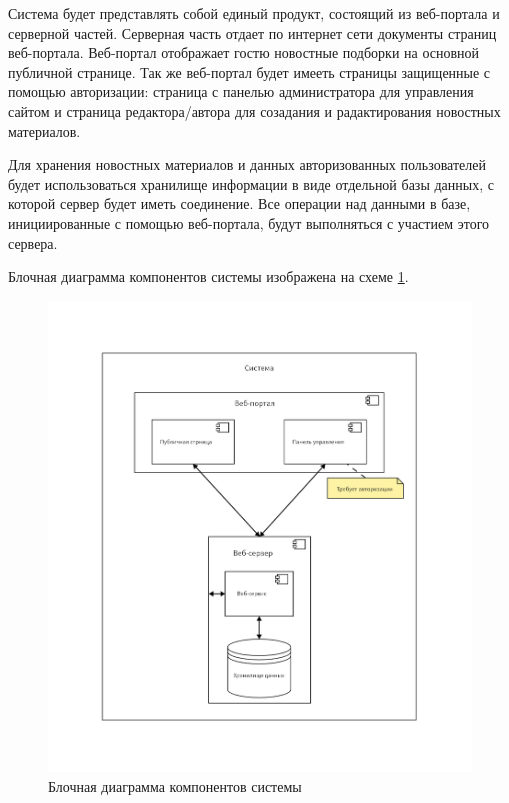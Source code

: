 Система будет представлять собой единый продукт, состоящий из веб-портала и серверной частей. Серверная часть отдает по интернет сети документы страниц веб-портала. Веб-портал отображает гостю новостные подборки на основной публичной странице. Так же веб-портал будет имееть страницы защищенные с помощью авторизации: страница с панелью администратора для управления сайтом и страница редактора/автора для созадания и радактирования новостных материалов. 

Для хранения новостных материалов и данных авторизованных пользователей будет использоваться хранилище информации в виде отдельной базы данных, с которой сервер будет иметь соединение. Все операции над данными в базе, инициированные с помощью веб-портала, будут выполняться с участием этого сервера.

Блочная диаграмма компонентов системы изображена на схеме \ref{fig:product-perspective}.

\begin{figure}[H]
    \centering
    \includegraphics[width=\textwidth]{res/product-perspective.png}
    \caption{Блочная диаграмма компонентов системы}
    \label{fig:product-perspective}
\end{figure}

